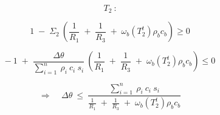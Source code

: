\begin{adjustwidth}{0cm}{0cm}
	\begin{multicols}{3} %
		
		
		\hspace{-3cm}
		\begin{minipage}{\columnwidth}	
			\vspace{1cm}
			$$T_2 \: \mbox{:}$$ 
		\end{minipage}
		
		\columnbreak %
		
		
		\hspace{-5.5cm}
		\begin{minipage}{\columnwidth}	
			$$
			1 \;-\; \Sigma_2 \: \left(\frac{1}{R_1} \;+\; \frac{1}{R_3} \;+\; \omega_b (T_2^t) \rho_b c_b \right) \geq 0
			$$
			
			\vspace{-1cm}
			
			$$
			- \: 1 \;+\; \frac{\Delta \theta}{\sum_{i=1}^n \: \rho_i \: c_i \: s_i} \: \left(\frac{1}{R_1} \;+\; \frac{1}{R_3} \;+\; \omega_b (T_2^t) \rho_b c_b \right) \leq 0
			$$
			
			
		\end{minipage}
		
		\columnbreak
		
		\hspace{-1.5cm}
		\begin{minipage}{1.3\columnwidth}
			\vspace{0.7cm}
			$$
			\Rightarrow \;\;\;\; \Delta \theta \:\leq\: \frac{\sum_{i=1}^n \: \rho_i \: c_i \: s_i}{\frac{1}{R_1} \;+\; \frac{1}{R_3} \;+\; \omega_b (T_2^t) \rho_b c_b}
			$$
		\end{minipage}
		
	\end{multicols}
\end{adjustwidth}

